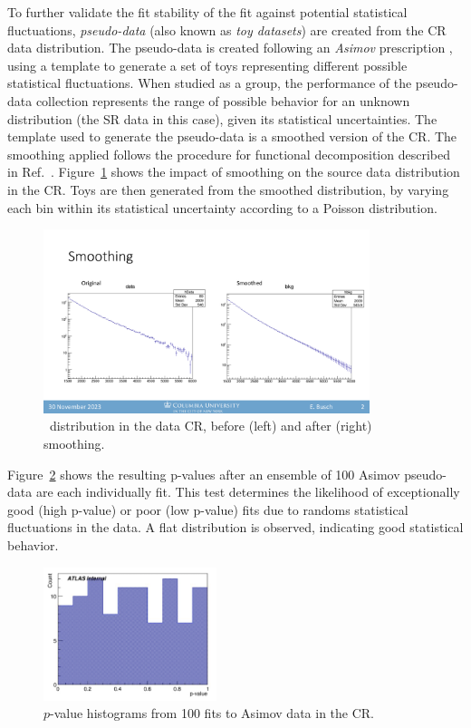 To further validate the fit stability of the fit against potential statistical fluctuations, \textit{pseudo-data} (also known as \textit{toy datasets}) are created from the CR data distribution. 
The pseudo-data is created following an \textit{Asimov} prescription \cite{asimov}, using a template to generate a set of toys representing different possible statistical fluctuations.
When studied as a group, the performance of the pseudo-data collection represents the range of possible behavior for an unknown distribution (the SR data in this case), given its statistical uncertainties.
The template used to generate the pseudo-data is a smoothed version of the CR. 
The smoothing applied follows the procedure for functional decomposition described in Ref.~\cite{edgar2018functional}.
Figure~\ref{fig:smoothing} shows the impact of smoothing on the source data distribution in the CR.
Toys are then generated from the smoothed distribution, by varying each bin within its statistical uncertainty according to a Poisson distribution. 
\begin{figure}[!htbp]
\centering
   \includegraphics[width=0.85\textwidth]{figures/stats/smoothing}
    \caption{\mt~distribution in the data CR, before (left) and after (right) smoothing.
    \label{fig:smoothing}}
\end{figure}

Figure~\ref{fig:asimov_hist} shows the resulting p-values after an ensemble of 100 Asimov pseudo-data are each individually fit. 
This test determines the likelihood of exceptionally good (high p-value) or poor (low p-value) fits due to randoms statistical fluctuations in the data. 
A flat distribution is observed, indicating good statistical behavior. 
\begin{figure}[!htbp]
\centering
   \includegraphics[width=0.45\textwidth]{figures/stats/asimov_cr_hist}
    \caption{$p$-value histograms from 100 fits to Asimov data in the CR. %
    \label{fig:asimov_hist}}
\end{figure}

